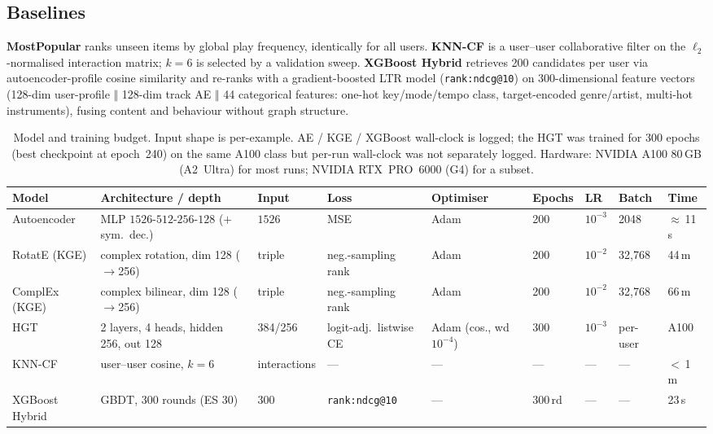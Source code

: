 \documentclass[10pt,twocolumn,letterpaper]{article}
\begin{document}
\subsection{Baselines}
\textbf{MostPopular} ranks unseen items by global play frequency, identically for
all users. \textbf{KNN-CF} is a user--user collaborative filter on the
$\ell_2$-normalised interaction matrix; $k{=}6$ is selected by a validation sweep.
\textbf{XGBoost Hybrid} retrieves 200 candidates per user via autoencoder-profile
cosine similarity and re-ranks with a gradient-boosted LTR model
(\texttt{rank:ndcg@10}) on 300-dimensional feature vectors (128-dim user-profile
$\Vert$ 128-dim track AE $\Vert$ 44 categorical features: one-hot key/mode/tempo
class, target-encoded genre/artist, multi-hot instruments), fusing content and
behaviour without graph structure.

\begin{table}[t]
\centering\scriptsize
\caption{Model and training budget. Input shape is per-example. AE / KGE / XGBoost
wall-clock is logged; the HGT was trained for 300 epochs (best checkpoint at
epoch~240) on the same A100 class but per-run wall-clock was not separately logged.
Hardware: NVIDIA A100 80\,GB (A2~Ultra) for most runs; NVIDIA RTX~PRO~6000 (G4) for
a subset.}
\label{tab:budget}
\setlength{\tabcolsep}{3.5pt}
\renewcommand{\arraystretch}{1.2}
\begin{tabular}{lllllllll}
\toprule
\textbf{Model} & \textbf{Architecture / depth} & \textbf{Input} & \textbf{Loss} & \textbf{Optimiser} & \textbf{Epochs} & \textbf{LR} & \textbf{Batch} & \textbf{Time}\\
\midrule
Autoencoder & MLP $1526$-$512$-$256$-$128$ ($+$sym.\ dec.) & $1526$ & MSE & Adam & 200 & $10^{-3}$ & 2048 & $\approx$\,11\,s\\
RotatE (KGE) & complex rotation, dim 128 ($\to$256) & triple & neg.-sampling rank & Adam & 200 & $10^{-2}$ & 32{,}768 & 44\,m\\
ComplEx (KGE) & complex bilinear, dim 128 ($\to$256) & triple & neg.-sampling rank & Adam & 200 & $10^{-2}$ & 32{,}768 & 66\,m\\
HGT & 2 layers, 4 heads, hidden 256, out 128 & 384/256 & logit-adj.\ listwise CE & Adam (cos., wd $10^{-4}$) & 300 & $10^{-3}$ & per-user & A100\\
KNN-CF & user--user cosine, $k{=}6$ & interactions & --- & --- & --- & --- & --- & $<$\,1\,m\\
XGBoost Hybrid & GBDT, 300 rounds (ES 30) & 300 & \texttt{rank:ndcg@10} & --- & 300\,rd & --- & --- & 23\,s\\
\bottomrule
\end{tabular}
\end{table}
\end{document}
